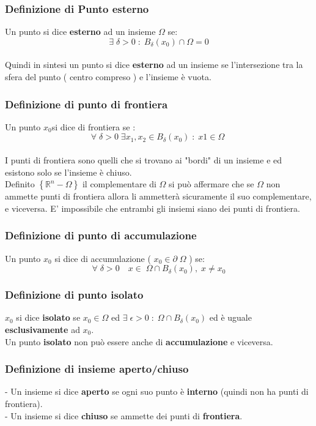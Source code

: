 \documentclass[fontsize = 20px, paper = a4]{article}
\begin{document}
\subsubsection{Definizione di Punto esterno}
Un punto si dice \textbf{esterno} ad un insieme $\Omega $ se:
$$\exists \; \delta > 0 \; : \;  B_\delta(x_0) \cap \Omega = 0$$ \\
Quindi in sintesi un punto si dice \textbf{esterno} ad un insieme se l'intersezione tra la sfera del punto ( centro compreso ) e l'insieme è vuota.
\subsubsection{Definizione di punto di frontiera}
Un punto $x_0$si dice di frontiera se :
$$\forall \; \delta >0 \; \exists x_1,x_2 \in B_\delta(x_0) \; : \; x1 \in \Omega \; $$ \\
I punti di frontiera sono quelli che si trovano ai "bordi" di un insieme e ed esistono solo se l'insieme è chiuso. \\
Definito $\left \{ \mathbb{R}^n - \Omega \right \}$ il complementare di $\Omega$ si può affermare che se $\Omega$ non ammette punti di frontiera allora li ammetterà sicuramente il suo complementare, e viceversa. E' impossibile che entrambi gli insiemi siano dei punti di frontiera.
\subsubsection{Definizione di punto di accumulazione}
Un punto $x_0$ si dice di accumulazione ( $x_0 \in \partial \; \Omega$ ) se:
$$\forall \; \delta > 0 \quad x \in \; \Omega \cap B_\delta \left(x_0 \right), \; x \neq x_0$$
\subsubsection{Definizione di punto isolato}
$x_0$ si dice \textbf{isolato} se $x_0 \in \Omega$ ed $\exists \; \epsilon > 0 \; : \; \Omega \cap B_\delta(x_0)$ ed è uguale \textbf{esclusivamente} ad $x_0$. \\
Un punto \textbf{isolato} non può essere anche di \textbf{accumulazione} e viceversa.
\subsubsection{Definizione di insieme aperto/chiuso}
- Un insieme si dice \textbf{aperto} se ogni suo punto è \textbf{interno} (quindi non ha punti di frontiera). \\
- Un insieme si dice \textbf{chiuso} se ammette dei punti di \textbf{frontiera}.
\end{document}
